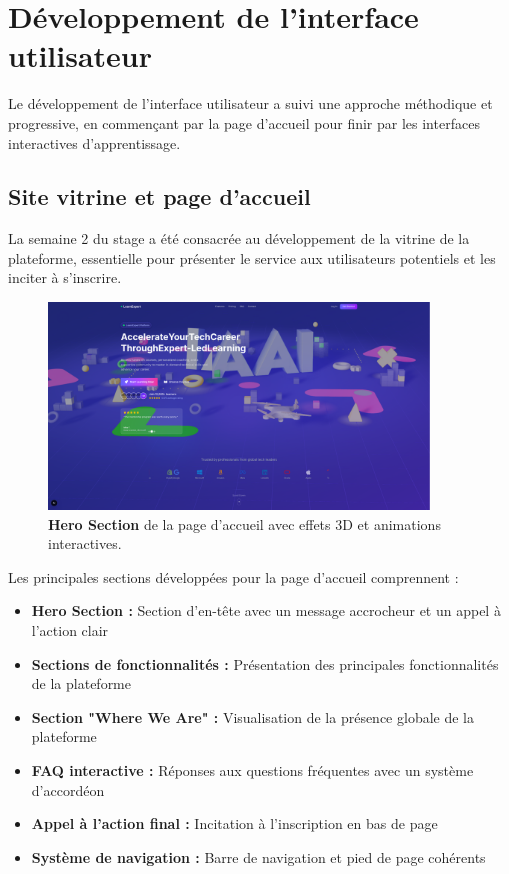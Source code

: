 \section{Développement de l'interface utilisateur}

Le développement de l'interface utilisateur a suivi une approche méthodique et progressive, en commençant par la page d'accueil pour finir par les interfaces interactives d'apprentissage.

\subsection{Site vitrine et page d'accueil}

La semaine 2 du stage a été consacrée au développement de la vitrine de la plateforme, essentielle pour présenter le service aux utilisateurs potentiels et les inciter à s'inscrire.

\begin{figure}[H]
  \centering
  \includegraphics[width=0.9\textwidth,keepaspectratio]{week_2_img/last_and_improved_hero_section_withe_3d_effects_etc.png}
  \caption{\textbf{Hero Section} de la page d'accueil avec effets 3D et animations interactives.}
  \label{fig:hero_section}
\end{figure}

Les principales sections développées pour la page d'accueil comprennent :
\begin{itemize}
  \item \textbf{Hero Section :} Section d'en-tête avec un message accrocheur et un appel à l'action clair
  \item \textbf{Sections de fonctionnalités :} Présentation des principales fonctionnalités de la plateforme
  \item \textbf{Section "Where We Are" :} Visualisation de la présence globale de la plateforme
  \item \textbf{FAQ interactive :} Réponses aux questions fréquentes avec un système d'accordéon
  \item \textbf{Appel à l'action final :} Incitation à l'inscription en bas de page
  \item \textbf{Système de navigation :} Barre de navigation et pied de page cohérents
\end{itemize}

